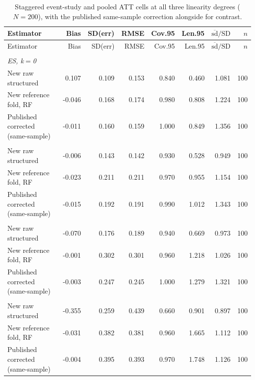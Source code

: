 {\footnotesize
\begin{longtable}{lrrrrrrr}
\caption{Staggered event-study and pooled ATT cells at all three linearity degrees ($N=200$), with the published same-sample correction alongside for contrast.}\label{tab:completion_staggered}\\
\toprule
Estimator & Bias & SD(err) & RMSE & Cov.95 & Len.95 & $\overline{\mathrm{sd}}/\mathrm{SD}$ & $n$ \\
\midrule
\endfirsthead
Estimator & Bias & SD(err) & RMSE & Cov.95 & Len.95 & $\overline{\mathrm{sd}}/\mathrm{SD}$ & $n$ \\
\midrule
\endhead
\bottomrule
\endlastfoot
\multicolumn{8}{l}{\textit{degree $d=1$}} \\
\multicolumn{8}{l}{\textit{ES, k$=$0}} \\
\quad New raw structured & 0.107 & 0.109 & 0.153 & 0.840 & 0.460 & 1.081 & 100 \\
\quad New reference fold, RF & -0.046 & 0.168 & 0.174 & 0.980 & 0.808 & 1.224 & 100 \\
\quad Published corrected (same-sample) & -0.011 & 0.160 & 0.159 & 1.000 & 0.849 & 1.356 & 100 \\
\addlinespace
\multicolumn{8}{l}{\textit{ES, k$=$1}} \\
\quad New raw structured & -0.006 & 0.143 & 0.142 & 0.930 & 0.528 & 0.949 & 100 \\
\quad New reference fold, RF & -0.023 & 0.211 & 0.211 & 0.970 & 0.955 & 1.154 & 100 \\
\quad Published corrected (same-sample) & -0.015 & 0.192 & 0.191 & 0.990 & 1.012 & 1.343 & 100 \\
\addlinespace
\multicolumn{8}{l}{\textit{ES, k$=$2}} \\
\quad New raw structured & -0.070 & 0.176 & 0.189 & 0.940 & 0.669 & 0.973 & 100 \\
\quad New reference fold, RF & -0.001 & 0.302 & 0.301 & 0.960 & 1.218 & 1.026 & 100 \\
\quad Published corrected (same-sample) & -0.003 & 0.247 & 0.245 & 1.000 & 1.279 & 1.321 & 100 \\
\addlinespace
\multicolumn{8}{l}{\textit{ES, k$=$3}} \\
\quad New raw structured & -0.355 & 0.259 & 0.439 & 0.660 & 0.901 & 0.897 & 100 \\
\quad New reference fold, RF & -0.031 & 0.382 & 0.381 & 0.960 & 1.665 & 1.112 & 100 \\
\quad Published corrected (same-sample) & -0.004 & 0.395 & 0.393 & 0.970 & 1.748 & 1.126 & 100 \\

\end{longtable}}
